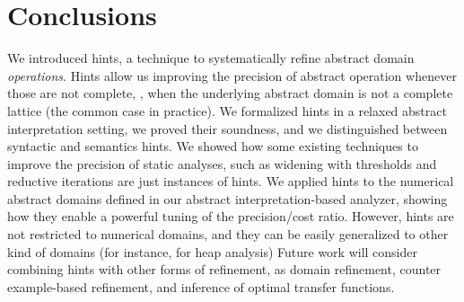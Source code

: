 \documentclass{llncs}
\newcommand{\sopra}{\vspace{-.3cm}}
\begin{document}
\section{Conclusions}
\sopra
We introduced hints, a technique to systematically refine abstract domain \emph{operations}.
Hints allow us improving the precision of abstract operation whenever those are not complete, \eg, when  the underlying abstract domain is not a complete lattice (the common case in practice).
We formalized hints in a relaxed abstract interpretation setting, we proved their soundness, and we distinguished between syntactic and semantics hints.
We showed how some existing techniques to improve the precision of static analyses, such as widening with thresholds and reductive iterations are just instances of hints.  
We applied hints to the numerical abstract domains defined in our abstract interpretation-based analyzer, showing how they enable a powerful tuning of the precision/cost ratio.
However, hints are not restricted to numerical domains, and they can be easily generalized to other kind of domains (for instance, for heap analysis)
Future work will consider combining hints with other forms of refinement, as domain refinement, counter example-based refinement, and inference of optimal transfer functions.


{
\tiny

}
\end{document}
